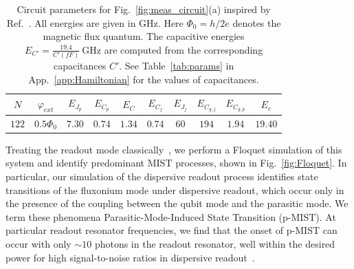 \documentclass[%
reprint,
superscriptaddress,
 amsmath,amssymb,
 aps,
 prx,
longbibliography,
floatfix,
]{revtex4-2}
\begin{document}
\begin{table}[h]
\centering
\begin{tabular}{|c|c|c|c|c|c|c|c|c|c|}
    \hline
     $N$ & $\varphi_{ext}$ & $E_{J_p}$ & $E_{C_p}$ & $E_C$ & $E_{C_j}$ & $E_{J_j}$ & $E_{C_{g,j}}$ & $E_{C_{g,p}}$ & $E_c$ \\
    \hline
    $122$ & $0.5\Phi_0$ & $7.30$ & $0.74$ & $1.34$ & $0.74$ & $60$ & $194$ & $1.94$ & $19.40$ \\
    \hline
\end{tabular}
\caption{Circuit parameters for Fig.~\ref{fig:meas_circuit}(a) inspired by Ref.~\cite{zhang_universal_2021}. All energies are given in GHz. Here $\Phi_0=h/2e$ denotes the magnetic flux quantum. The capacitive energies $E_{C'}=\frac{19.4}{{C'}(fF)} \ \mathrm{GHz}$ are computed from the corresponding capacitances $C'$. See Table~\ref{tab:params} in App.~\ref{app:Hamiltonian} for the values of capacitances.}
\label{tab:circuit_params}
\end{table}

Treating the readout mode classically~\cite{cohen2023reminiscence,dumas2024unified}, we perform a Floquet simulation of this system and identify predominant MIST processes, shown in Fig.~\ref{fig:Floquet}. In particular, our simulation of the dispersive readout process identifies state transitions of the fluxonium mode under dispersive readout, which occur only in the presence of the coupling between the qubit mode and the parasitic mode. We term these phenomena Parasitic-Mode-Induced State Transition (p-MIST). At particular readout resonator frequencies, we find that the onset of p-MIST  can occur with only $\sim 10$ photons in the readout resonator, well within the desired power for high signal-to-noise ratios in dispersive readout~\cite{gusenkova2021quantum}.
\end{document}
